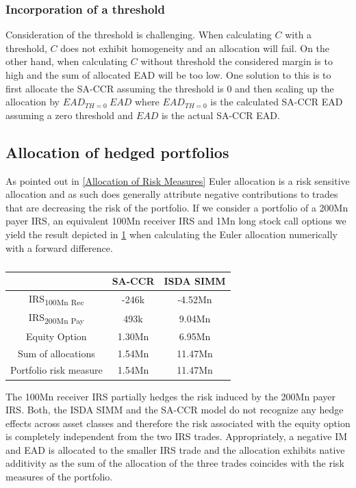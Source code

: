 \documentclass[../Thesis_AHoecherl.tex]{subfiles}
\begin{document}
    \subsubsection{Incorporation of a threshold}

    Consideration of the threshold is challenging. When calculating $C$ with a threshold, $C$ does not exhibit homogeneity and an allocation will fail. On the other hand, when calculating $C$ without threshold the considered margin is to high and the sum of allocated EAD will be too low.
    One solution to this is to first allocate the SA-CCR assuming the threshold is 0 and then scaling up the allocation by $EAD_{TH = 0} \ EAD$ where $EAD_{TH = 0}$ is the calculated SA-CCR EAD assuming a zero threshold and $EAD$ is the actual SA-CCR EAD.


    \subsection{Allocation of hedged portfolios}

    As pointed out in \ref{Allocation of Risk Measures} Euler allocation is a risk sensitive allocation and as such does generally attribute negative contributions to trades that are decreasing the risk of the portfolio. If we consider a portfolio of a 200Mn payer IRS, an equivalent 100Mn receiver IRS and 1Mn long stock call options we yield the result depicted in \ref{tab:hedge trade sample results} when calculating the Euler allocation numerically with a forward difference.
    \begin{table}[htbp]
        \label{tab:hedge trade sample results}
        \centering
            \begin{tabular}{c|c|c}
                & SA-CCR & ISDA SIMM \\
                \toprule
                IRS\textsubscript{100Mn Rec} & -246k & -4.52Mn \\
                \midrule
                IRS\textsubscript{200Mn Pay} & 493k & 9.04Mn \\
                \midrule
                Equity Option & 1.30Mn & 6.95Mn \\
                \bottomrule
                Sum of allocations & 1.54Mn & 11.47Mn \\
                \midrule
                Portfolio risk measure & 1.54Mn & 11.47Mn \\
            \end{tabular}%
        \caption{}
    \end{table}
    The 100Mn receiver IRS partially hedges the risk induced by the 200Mn payer IRS. 
    Both, the ISDA SIMM and the SA-CCR model do not recognize any hedge effects across asset classes and therefore the risk associated with the equity option is completely independent from the two IRS trades. 
    Appropriately, a negative IM and EAD is allocated to the smaller IRS trade and the allocation exhibits native additivity as the sum of the allocation of the three trades coincides with the risk measures of the portfolio.
    
\end{document}
